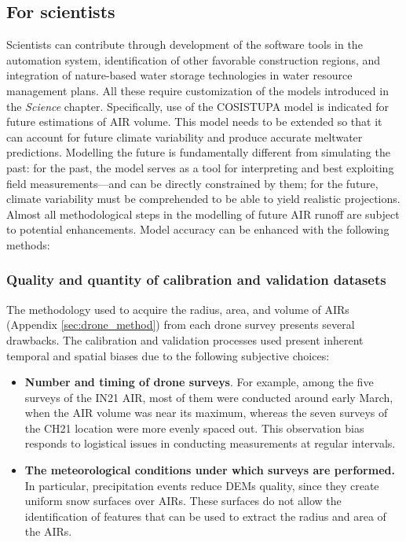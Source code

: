 \subsection{For scientists}

Scientists can contribute through development of the software tools in the automation system, identification of
other favorable construction regions, and integration of nature-based water storage technologies in water
resource management plans. All these require customization of the models introduced in the
\textit{Science} chapter. Specifically, use of the COSISTUPA model is indicated for future estimations of AIR
volume. This model needs to be extended so that it can account for future climate variability and produce
accurate meltwater predictions. Modelling the future is fundamentally different from simulating the past: for the
past, the model serves as a tool for interpreting and best exploiting field measurements---and can be directly
constrained by them; for the future, climate variability must be comprehended to be able to yield realistic
projections. Almost all methodological steps in the modelling of future AIR runoff are subject to potential
enhancements. Model accuracy can be enhanced with the following methods:

\subsubsection{Quality and quantity of calibration and validation datasets}

The methodology used to acquire the radius, area, and volume of \ac{AIRs} (Appendix \ref{sec:drone_method}) from
each drone survey presents several drawbacks. The calibration and validation processes used present inherent temporal
and spatial biases due to the following subjective choices:

\begin{itemize}
	\item \textbf{Number and timing of drone surveys}. For example, among the five surveys of the IN21 AIR, most of them were
	      conducted around early March, when the AIR volume was near its maximum, whereas the seven surveys of the CH21
	      location were more evenly spaced out. This observation bias responds to logistical issues
	      in conducting measurements at regular intervals.

  \item \textbf{The meteorological conditions under which surveys are performed.} In particular, precipitation
    events reduce \ac{DEMs} quality, since they create uniform snow surfaces over \ac{AIRs}. These surfaces do
    not allow the identification of features that can be used to extract the radius and area of the \ac{AIRs}.

\end{itemize}

